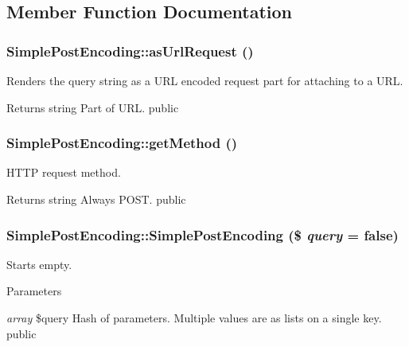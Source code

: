 \subsection{Member Function Documentation}
\hypertarget{class_simple_post_encoding_a037637d756843001ce01261e253b16a3}{
\subsubsection[{asUrlRequest}]{\setlength{\rightskip}{0pt plus 5cm}SimplePostEncoding::asUrlRequest ()}}
\label{class_simple_post_encoding_a037637d756843001ce01261e253b16a3}
Renders the query string as a URL encoded request part for attaching to a URL. \begin{DoxyReturn}{Returns}
string Part of URL.  public 
\end{DoxyReturn}
\hypertarget{class_simple_post_encoding_aa2adc333f1f0528f7f20afbd85b0f563}{
\subsubsection[{getMethod}]{\setlength{\rightskip}{0pt plus 5cm}SimplePostEncoding::getMethod ()}}
\label{class_simple_post_encoding_aa2adc333f1f0528f7f20afbd85b0f563}
HTTP request method. \begin{DoxyReturn}{Returns}
string Always POST.  public 
\end{DoxyReturn}
\hypertarget{class_simple_post_encoding_a15a21e5b65b2494c2e9136e18d05ff6b}{
\subsubsection[{SimplePostEncoding}]{\setlength{\rightskip}{0pt plus 5cm}SimplePostEncoding::SimplePostEncoding (\$ {\em query} = {\ttfamily false})}}
\label{class_simple_post_encoding_a15a21e5b65b2494c2e9136e18d05ff6b}
Starts empty. 
\begin{DoxyParams}{Parameters}
\item[{\em array}]\$query Hash of parameters. Multiple values are as lists on a single key.  public \end{DoxyParams}
